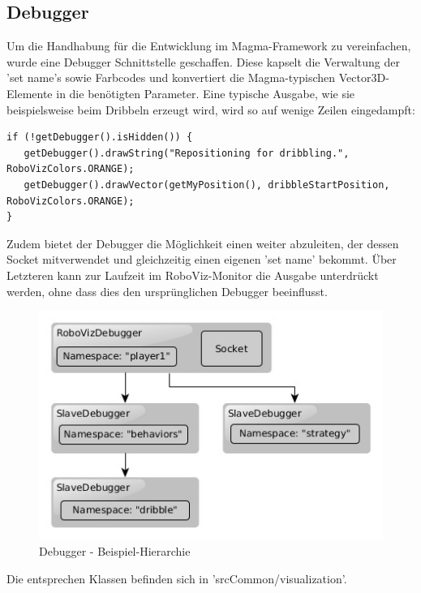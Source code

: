 \subsection{Debugger}
\label{subsec:Debugger}
Um die Handhabung für die Entwicklung im Magma-Framework zu vereinfachen, wurde eine Debugger Schnittstelle geschaffen. Diese kapselt die Verwaltung der 'set name's sowie Farbcodes und konvertiert die Magma-typischen Vector3D-Elemente in die benötigten Parameter. Eine typische Ausgabe, wie sie beispielsweise beim Dribbeln erzeugt wird, wird so auf wenige Zeilen eingedampft:
\begin{lstlisting}[caption=RoboVizDebugger, captionpos=b, label=lst:Debug]
if (!getDebugger().isHidden()) {
   getDebugger().drawString("Repositioning for dribbling.", RoboVizColors.ORANGE);
   getDebugger().drawVector(getMyPosition(), dribbleStartPosition, RoboVizColors.ORANGE);
}
\end{lstlisting}

Zudem bietet der Debugger die Möglichkeit einen weiter abzuleiten, der dessen Socket mitverwendet und gleichzeitig einen eigenen 'set name' bekommt. Über Letzteren kann zur Laufzeit im RoboViz-Monitor die Ausgabe unterdrückt werden, ohne dass dies den ursprünglichen Debugger beeinflusst.

\begin{figure}[H]
	\centering
	\includegraphics[width=\ScaleIfNeeded]{Grafiken/RoboViz/Debugger}
	\caption{Debugger - Beispiel-Hierarchie}
	\label{fig:debugger-hierarchy}
\end{figure}

Die entsprechen Klassen befinden sich in 'srcCommon/visualization'.

